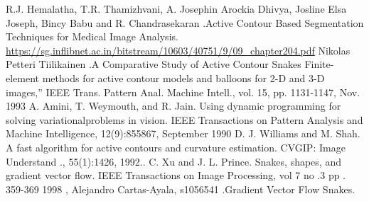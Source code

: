 \documentclass[english,a4,12pt]{report}
\begin{document}
\begin{thebibliography}{99}
         R.J. Hemalatha, T.R. Thamizhvani, A. Josephin Arockia Dhivya, Josline Elsa Joseph, Bincy Babu and R. Chandrasekaran .Active Contour Based Segmentation Techniques for Medical Image Analysis.
         \url{https://sg.inflibnet.ac.in/bitstream/10603/40751/9/09_chapter204.pdf}
         Nikolas Petteri Tiilikainen  .A Comparative Study of Active Contour Snakes
         Finite-element methods for active contour models and balloons for 2-D and 3-D images,” IEEE Trans. Pattern Anal. Machine Intell., vol. 15, pp. 1131-1147, Nov. 1993
         A. Amini, T. Weymouth, and R. Jain. Using dynamic programming for solving variationalproblems in vision. IEEE Transactions on Pattern Analysis and Machine Intelligence, 12(9):855{867, September 1990}
         D. J. Williams and M. Shah. A fast algorithm for active contours and curvature estimation. CVGIP: Image Understand ., 55(1):14{26, 1992..}
         C. Xu and J. L. Prince. Snakes, shapes, and gradient vector flow. IEEE Transactions on Image Processing, vol 7 no .3 pp . 359-369 1998 ,
         Alejandro Cartas-Ayala, s1056541 .Gradient Vector Flow Snakes.

    \end{thebibliography}
\end{document}
